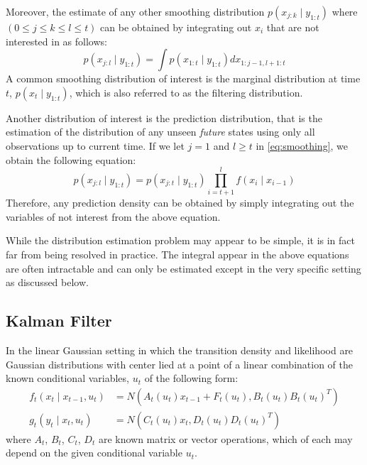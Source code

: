 Moreover, the estimate of any other smoothing distribution $p(x_{j:k} \mid y_{1:t})$ where $(0 \leq 	j \leq k \leq l \leq t)$ can be obtained by integrating out $x_i$ that are not interested in as follows:
\begin{equation}
  p(x_{j:l} \mid y_{1:t}) = \int p(x_{1:t} \mid y_{1:t}) dx_{1:j-1, l+1:t}
\label{eq:smoothing}
\end{equation}
A common smoothing distribution of interest is the marginal distribution at time $t$, $p(x_t \mid y_{1:t})$, which is also referred to as the filtering distribution.

Another distribution of interest is  the prediction distribution, that is the estimation of the distribution of any unseen \emph{future} states using only all observations up to current time. If we let $j = 1$ and $l \geq t$ in \eqref{eq:smoothing}, we obtain the following equation:
\begin{equation}
  p(x_{j:l} \mid y_{1:t}) = p(x_{j:t} \mid y_{1:t}) \prod^l_{i=t+1} f(x_i \mid x_{i-1})
\end{equation}
Therefore, any prediction density can be obtained by simply integrating out the variables of not interest from the above equation.

While the distribution estimation problem may appear to be simple, it is in fact far from being resolved in practice. The integral appear in the above equations are often intractable and can only be estimated except in the very specific setting as discussed below.

\subsection{Kalman Filter}
\label{sec:KF}
In the linear Gaussian setting in which the transition density and likelihood are Gaussian distributions with center lied at a point of a linear combination of the known conditional variables, $u_t$ of the following form:
\begin{align}
  f_t(x_t \mid x_{t-1}, u_t) &= N(A_t(u_t) x_{t-1} + F_t(u_t), B_t(u_t)B_t(u_t)^T) \nonumber \\
  g_t(y_t \mid x_t, u_t)    &= N(C_t(u_t) x_t, D_t(u_t)D_t(u_t)^T)
\end{align}
where $A_t$, $B_t$, $C_t$, $D_t$ are known matrix or vector operations, which of each may depend on the given conditional variable $u_t$.

